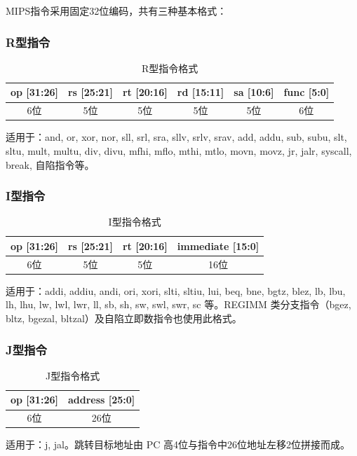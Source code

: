 MIPS指令采用固定32位编码，共有三种基本格式：

\subsubsection{R型指令}

\begin{table}[H]
    \centering
    \begin{tabular}{|c|c|c|c|c|c|}
        \hline
        op [31:26] & rs [25:21] & rt [20:16] & rd [15:11] & sa [10:6] & func [5:0] \\
        \hline
        6位 & 5位 & 5位 & 5位 & 5位 & 6位 \\
        \hline
    \end{tabular}
    \caption{R型指令格式}
\end{table}

适用于：and, or, xor, nor, sll, srl, sra, sllv, srlv, srav, add, addu, sub, subu, slt, sltu, mult, multu, div, divu, mfhi, mflo, mthi, mtlo, movn, movz, jr, jalr, syscall, break, 自陷指令等。

\subsubsection{I型指令}

\begin{table}[H]
    \centering
    \begin{tabular}{|c|c|c|c|}
        \hline
        op [31:26] & rs [25:21] & rt [20:16] & immediate [15:0] \\
        \hline
        6位 & 5位 & 5位 & 16位 \\
        \hline
    \end{tabular}
    \caption{I型指令格式}
\end{table}

适用于：addi, addiu, andi, ori, xori, slti, sltiu, lui, beq, bne, bgtz, blez, lb, lbu, lh, lhu, lw, lwl, lwr, ll, sb, sh, sw, swl, swr, sc 等。REGIMM 类分支指令（bgez, bltz, bgezal, bltzal）及自陷立即数指令也使用此格式。

\subsubsection{J型指令}

\begin{table}[H]
    \centering
    \begin{tabular}{|c|c|}
        \hline
        op [31:26] & address [25:0] \\
        \hline
        6位 & 26位 \\
        \hline
    \end{tabular}
    \caption{J型指令格式}
\end{table}

适用于：j, jal。跳转目标地址由 PC 高4位与指令中26位地址左移2位拼接而成。

